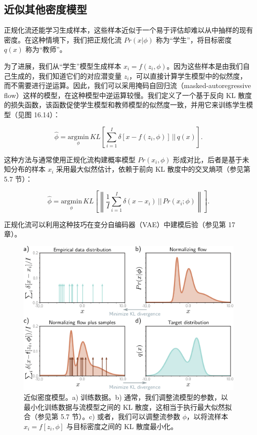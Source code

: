 \subsection{近似其他密度模型}
正规化流还能学习生成样本，这些样本近似于一个易于评估却难以从中抽样的现有密度。在这种情境下，我们把正规化流 \(Pr(x|\phi)\) 称为“学生”，将目标密度 \(q(x)\) 称为“教师”。

为了进展，我们从“学生”模型生成样本 \(x_i = f(z_i, \phi)\)。因为这些样本是由我们自己生成的，我们知道它们的对应潜变量 \(z_i\)，可以直接计算学生模型中的似然度，而不需要进行逆运算。因此，我们可以采用掩码自回归流（masked-autoregressive flow）这样的模型，在这种模型中逆运算较慢。我们定义了一个基于反向 KL 散度的损失函数，该函数促使学生模型和教师模型的似然度一致，并用它来训练学生模型（见图 16.14）：

\begin{equation}
\hat{\phi} = \underset{\phi}{\text{argmin}} \, KL \left[ \sum_{i=1}^{I} \delta [x - f(z_i, \phi)] \, || \, q(x) \right]. 
\end{equation}


这种方法与通常使用正规化流构建概率模型 \(Pr(x_i, \phi)\) 形成对比，后者是基于未知分布的样本 \(x_i\) 采用最大似然估计，依赖于前向 KL 散度中的交叉熵项（参见第 5.7 节）：

\begin{equation}
\hat{\phi} = \underset{\phi}{\text{argmin}} \, KL \left[ \left\| \frac{1}{I} \sum_{i=1}^{I} \delta (x - x_i) \, || \, Pr(x_i; \phi) \right\| \right]. 
\end{equation}


正规化流可以利用这种技巧在变分自编码器（VAE）中建模后验（参见第 17 章）。

\begin{figure}[ht!]
\centering
\includegraphics[width=0.7\linewidth]{png/chapter16/FlowTypeII.png}
\caption{近似密度模型。a) 训练数据。b) 通常，我们调整流模型的参数，以最小化训练数据与流模型之间的 KL 散度，这相当于执行最大似然拟合（参见第 5.7 节）。c) 或者，我们可以调整流参数 \(\phi\)，以将流样本 \(x_i = f[z_i , \phi]\) 与目标密度之间的 KL 散度最小化。}
\end{figure}


